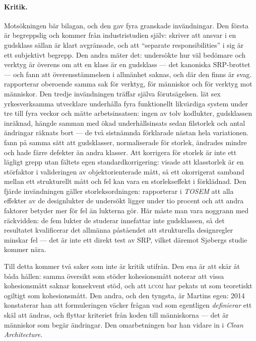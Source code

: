 \paragraph{Kritik.}  Motsökningen bär bilagan, och den gav fyra granskade
invändningar.  Den första är begreppslig och kommer från industristudien
själv: \textcite{Anquetil2019Decomposing} skriver att ansvar i en
gudsklass sällan är klart avgränsade, och att
\enquote{separate responsibilities} i sig är ett subjektivt begrepp.  Den
andra mäter det: \textcite{Alkharabsheh2021Analysing} undersökte hur väl
bedömare och verktyg är överens om att en klass är en gudsklass --- det
kanoniska SRP-brottet --- och fann att överensstämmelsen i allmänhet
saknas, och där den finns är svag.  \Textcite{Hall2014Some} rapporterar
oberoende samma sak för verktyg, för människor och för verktyg mot
människor.  Den tredje invändningen träffar själva förutsägelsen.
\Textcite{Sjoberg2013Quantifying} lät sex yrkesverksamma utvecklare
underhålla fyra funktionellt likvärdiga system under tre till fyra
veckor och mätte arbetsinsatsen: ingen av tolv kodlukter, gudsklassen
inräknad, hängde samman med ökad underhållsinsats sedan filstorlek och
antal ändringar räknats bort --- de två sistnämnda förklarade nästan hela
variationen.  \Textcite{Olbrich2010Areall} fann på samma sätt att
gudsklasser, normaliserade för storlek, ändrades mindre och hade färre
defekter än andra klasser.  Att korrigera för storlek är inte ett
lägligt grepp utan fältets egen standardkorrigering:
\textcite{ElEmam2001Confounding} visade att klasstorlek är en
störfaktor i valideringen av objektorienterade mått, så ett okorrigerat
samband mellan ett strukturellt mått och fel kan vara en storlekseffekt
i förklädnad.  Den fjärde invändningen gäller storleksordningen:
\textcite{Hall2014Some} rapporterar i \emph{TOSEM} att alla effekter av
de designlukter de undersökt ligger under tio procent och att andra
faktorer betyder mer för fel än lukterna gör.  Här måste man vara
noggrann med räckvidden: de fem lukter de studerar innefattar inte
gudsklassen, så det resultatet kvalificerar det allmänna påståendet att
strukturella designregler minskar fel --- det är inte ett direkt test av
SRP, vilket däremot Sjøbergs studie kommer nära.

Till detta kommer två saker som inte är kritik utifrån.  Den ena är att
\textcite{Iftikhar2024Tertiary} skär åt båda hållen: samma översikt som
stöder kohesionsmått noterar att vissa kohesionsmått saknar konsekvent
stöd, och att \textsc{lcom} har pekats ut som teoretiskt ogiltigt som
kohesionsmått.  Den andra, och den tyngsta, är Martins egen: 2014
konstaterar han att formuleringen väcker frågan vad som egentligen
\emph{definierar} ett skäl att ändras, och flyttar kriteriet från koden
till människorna --- det är människor som begär
ändringar\autocite{Martin2014SRP}.  Den omarbetningen bar han vidare in i
\emph{Clean Architecture}.

